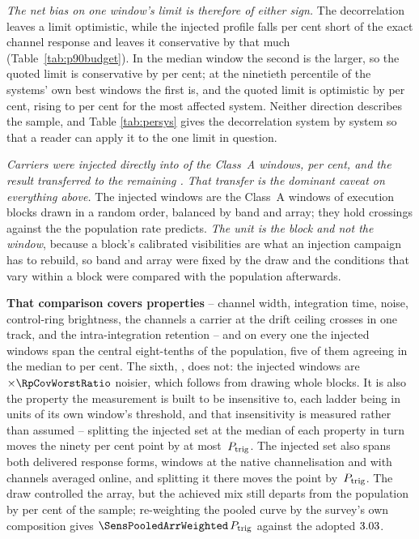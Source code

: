 \emph{The net bias on one window's limit is therefore of either sign.} The
decorrelation leaves a limit optimistic, while the injected profile falls
\InjShortPct{} per cent short of the exact channel response and leaves it
conservative by that much (Table~\ref{tab:p90budget}). In the median window
the second is the larger, so the quoted limit is conservative by
\NmNetConsPct{} per cent; at the ninetieth percentile of the systems' own
best windows the first is, and the quoted limit is optimistic by
\NmNetOptPct{} per cent, rising to \NmNetOptMaxPct{} per cent for the most
affected system. Neither direction describes the sample, and Table
\ref{tab:persys} gives the decorrelation system by system so that a reader
can apply it to the one limit in question.

\emph{Carriers were injected directly into \SensNInj{} of the \NWinA{}
Class~A windows, \SensNInjPct{} per cent, and the result transferred to the
remaining \SensNTransfer. That transfer is the dominant caveat on everything
above.} The injected windows are the Class~A windows of execution blocks
drawn in a random order, balanced by band and array; they hold
\SensNCrossAch{} crossings against the \SensNCrossExp{} the population rate
predicts. \emph{The unit is the block and not the window}, because a block's
calibrated visibilities are what an injection campaign has to rebuild, so
band and array were fixed by the draw and the conditions that vary within a
block were compared with the population afterwards.

\textbf{That comparison covers \RpNAxis{} properties} -- channel width,
integration time, noise, control-ring brightness, the channels a carrier at
the drift ceiling crosses in one track, and the intra-integration retention
-- and on every one the injected windows span the central eight-tenths of the
population, five of them agreeing in the median to \RpCovOtherPct{} per cent.
The sixth, \RpCovWorstAxis, does not: the injected windows are
$\times\RpCovWorstRatio$ noisier, which follows from drawing whole blocks. It
is also the property the measurement is built to be insensitive to, each
ladder being in units of its own window's threshold, and that insensitivity
is measured rather than assumed -- splitting the injected set at the median
of each property in turn moves the ninety per cent point by at most
\RpFacShiftMax\,$P_{\rm trig}$. The injected set also spans both delivered
response forms, \TfInjNat{} windows at the native channelisation and
\TfInjAvg{} with channels averaged online, and splitting it there moves the
point by \TfFacShift\,$P_{\rm trig}$. The draw controlled the array, but the
achieved mix still departs from the population by \SensCovWorstPct{} per cent
of the sample; re-weighting the pooled curve by the survey's own composition
gives $\SensPooledArrWeighted\,P_{\rm trig}$ against the adopted
$3.03$.

